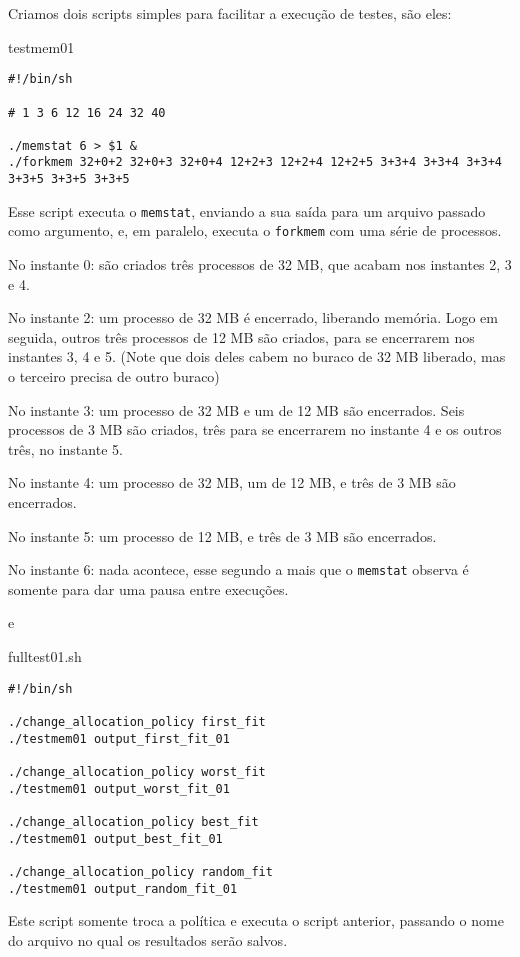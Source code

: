 \documentclass{amsart}
\theoremstyle{plain}
\newcommand{\code}[1]{\lstinline[mathescape=true]{#1}}
\begin{document}
Criamos dois scripts simples para facilitar a execução de testes, são eles:

testmem01

\begin{verbatim}
#!/bin/sh

# 1 3 6 12 16 24 32 40

./memstat 6 > $1 &
./forkmem 32+0+2 32+0+3 32+0+4 12+2+3 12+2+4 12+2+5 3+3+4 3+3+4 3+3+4 3+3+5 3+3+5 3+3+5
\end{verbatim}


Esse script executa o \code{memstat}, enviando a sua saída para um arquivo passado como argumento, e, em paralelo, executa o \code{forkmem} com uma série de processos.

No instante 0: são criados três processos de 32 MB, que acabam nos instantes 2, 3 e 4.

No instante 2: um processo de 32 MB é encerrado, liberando memória. Logo em seguida, outros três processos de 12 MB são criados, para se encerrarem nos instantes 3, 4 e 5. (Note que dois deles cabem no buraco de 32 MB liberado, mas o terceiro precisa de outro buraco)

No instante 3: um processo de 32 MB e um de 12 MB são encerrados. Seis processos de 3 MB são criados, três para se encerrarem no instante 4 e os outros três, no instante 5.

No instante 4: um processo de 32 MB, um de 12 MB, e três de 3 MB são encerrados.

No instante 5: um processo de 12 MB, e três de 3 MB são encerrados.

No instante 6: nada acontece, esse segundo a mais que o \code{memstat} observa é somente para dar uma pausa entre execuções.

e

fulltest01.sh


\begin{verbatim}
#!/bin/sh

./change_allocation_policy first_fit
./testmem01 output_first_fit_01

./change_allocation_policy worst_fit
./testmem01 output_worst_fit_01

./change_allocation_policy best_fit
./testmem01 output_best_fit_01

./change_allocation_policy random_fit
./testmem01 output_random_fit_01
\end{verbatim}


Este script somente troca a política e executa o script anterior, passando o nome do arquivo no qual os resultados serão salvos.
\end{document}
